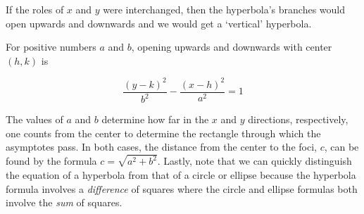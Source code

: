 \documentclass[nooutcomes]{ximera}
\begin{document}
If the roles of $x$ and $y$ were interchanged, then the hyperbola's branches would open upwards and downwards and we would get a `vertical' hyperbola.

\begin{definition}  For positive numbers $a$ and $b$,  opening upwards and downwards with center $(h,k)$ is

\[ \dfrac{(y-k)^2}{b^2} - \dfrac{(x-h)^2}{a^2} = 1 \]

\end{definition}
The values of $a$ and $b$ determine how far in the $x$ and $y$ directions, respectively, one counts from the center to determine the rectangle through which the asymptotes pass.  In both cases, the distance from the center to the foci, $c$, can be found by the formula $c = \sqrt{a^2 + b^2}$.  Lastly, note that we can quickly distinguish the equation of a hyperbola from that of a circle or ellipse because the hyperbola formula involves a \emph{difference} of squares where the circle and ellipse formulas both involve the \emph{sum} of squares.
\end{document}

